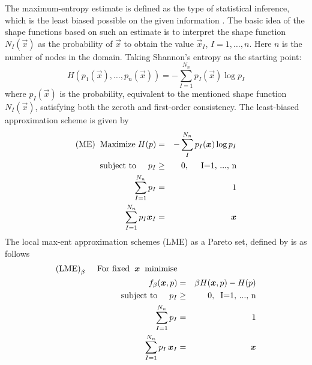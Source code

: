The maximum-entropy estimate is defined as the type of statistical
inference, which is the least biased possible on the given information
\cite{Jaynes1957}. The basic idea of the shape functions based on such
an estimate is to interpret the shape function $N_I(\vec{x})$ as the
probability of $\vec{x}$ to obtain the value $\vec{x}_I$,  $I=1,
\dots, n$. Here $n$ is the number of nodes in the domain.
Taking Shannon's entropy as the starting point:
\begin{equation}
  \label{eq:Shannon-entropy}
  H(p_1(\vec{x}),\ldots,p_n(\vec{x})) = -\sum^{N_n}_{I=1}{p_I(\vec{x})\log p_I }
\end{equation}
where $p_I(\vec{x})$ is the probability, equivalent to the mentioned
shape function $N_I(\vec{x})$,  satisfying both the zeroth and
first-order consistency. The least-biased approximation scheme is given by
\begin{eqnarray}
  \text{(ME)} \hspace{0.2cm} \text{Maximize} \hspace{0.1cm}H(p) &=&  -\sum_{I}^{N_n}{p_I(\vec{x})\log p_I } \nonumber \\
  \text{subject to} \hspace{0.5cm} p_I &\ge& 0, \hspace{0.5cm} \text{I=1, ..., n} \nonumber \\
  \sum_{I=1}^{N_n}{p_I} &=& 1 \nonumber \\
  \sum_{I=1}^{N_n}{p_I \vec{x}_I} &=& \vec{x} \nonumber 
\end{eqnarray}
The local max-ent approximation schemes (LME) as a Pareto set,
defined by \cite{Arroyo2006} is as follows 
\begin{eqnarray}
  \text{(LME)}_{\beta} \hspace{0.5cm} \text{For fixed} \hspace{0.2cm} \vec{x} \hspace{0.2cm} \text{minimise}  \nonumber \\
  \hspace{0.5cm}f_{\beta}(\vec{x}, p) &=& \beta H(\vec{x},p) - H(p)  \nonumber  \\
  \text{subject to} \hspace{0.5cm} p_I &\ge& 0, \hspace{0.2cm} \text{I=1, ..., n}  \nonumber \\
  \sum_{I=1}^{N_n}{p_I} &=& 1  \nonumber \\
  \sum_{I=1}^{N_n}{p_I \, \vec{x}_I} &=& \vec{x}    \nonumber 
\end{eqnarray}

